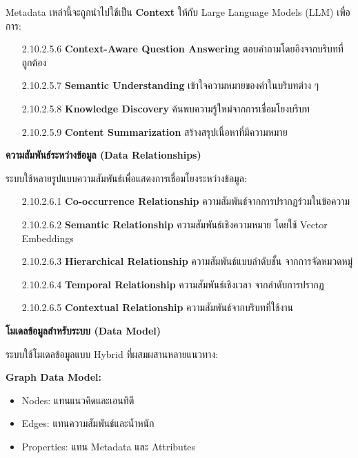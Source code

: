 \documentclass[12pt,a4paper]{article}
\begin{document}
\begin{enumerate}[leftmargin=2cm]
\begin{enumerate}
{\begin{enumerate}
            Metadata เหล่านี้จะถูกนำไปใช้เป็น \textbf{Context} ให้กับ Large Language Models (LLM) เพื่อการ:

            \begin{enumerate}
                \item[2.10.2.5.6] \textbf{Context-Aware Question Answering} ตอบคำถามโดยอิงจากบริบทที่ถูกต้อง
                \item[2.10.2.5.7] \textbf{Semantic Understanding} เข้าใจความหมายของคำในบริบทต่าง ๆ
                \item[2.10.2.5.8] \textbf{Knowledge Discovery} ค้นพบความรู้ใหม่จากการเชื่อมโยงบริบท
                \item[2.10.2.5.9] \textbf{Content Summarization} สร้างสรุปเนื้อหาที่มีความหมาย
            \end{enumerate}

            \vspace{0.3cm}

            \textbf{ความสัมพันธ์ระหว่างข้อมูล (Data Relationships)}

            \hspace{1cm}ระบบใช้หลายรูปแบบความสัมพันธ์เพื่อแสดงการเชื่อมโยงระหว่างข้อมูล:

            \begin{enumerate}
                \item[2.10.2.6.1] \textbf{Co-occurrence Relationship} ความสัมพันธ์จากการปรากฏร่วมในข้อความ
                \item[2.10.2.6.2] \textbf{Semantic Relationship} ความสัมพันธ์เชิงความหมาย โดยใช้ Vector Embeddings
                \item[2.10.2.6.3] \textbf{Hierarchical Relationship} ความสัมพันธ์แบบลำดับชั้น จากการจัดหมวดหมู่
                \item[2.10.2.6.4] \textbf{Temporal Relationship} ความสัมพันธ์เชิงเวลา จากลำดับการปรากฏ
                \item[2.10.2.6.5] \textbf{Contextual Relationship} ความสัมพันธ์จากบริบทที่ใช้งาน
            \end{enumerate}

            \vspace{0.3cm}

            \textbf{โมเดลข้อมูลสำหรับระบบ (Data Model)}

            \hspace{1cm}ระบบใช้โมเดลข้อมูลแบบ Hybrid ที่ผสมผสานหลายแนวทาง:

            \textbf{Graph Data Model:}
            \begin{itemize}
                \item Nodes: แทนแนวคิดและเอนทิตี
                \item Edges: แทนความสัมพันธ์และน้ำหนัก
                \item Properties: แทน Metadata และ Attributes
            \end{itemize}


\end{enumerate}}
\end{enumerate}
\end{enumerate}
\end{document}
